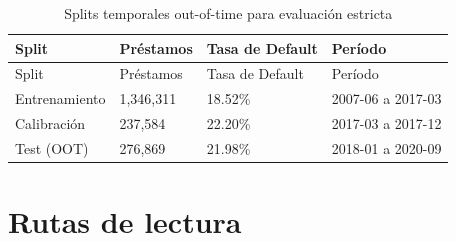 \documentclass[
  spanish,
  11pt,
  letterpaper,
]{scrbook}
\theoremstyle{plain}
\theoremstyle{remark}
\begin{document}
\begin{longtable}[]{@{}llll@{}}
\caption{Splits temporales out-of-time para evaluación
estricta}\label{tbl-splits}\tabularnewline
\toprule\noalign{}
Split & Préstamos & Tasa de Default & Período \\
\midrule\noalign{}
\endfirsthead
\toprule\noalign{}
Split & Préstamos & Tasa de Default & Período \\
\midrule\noalign{}
\endhead
\bottomrule\noalign{}
\endlastfoot
Entrenamiento & 1,346,311 & 18.52\% & 2007-06 a 2017-03 \\
Calibración & 237,584 & 22.20\% & 2017-03 a 2017-12 \\
Test (OOT) & 276,869 & 21.98\% & 2018-01 a 2020-09 \\
\end{longtable}

\section{Rutas de lectura}\label{rutas-de-lectura}
\end{document}

